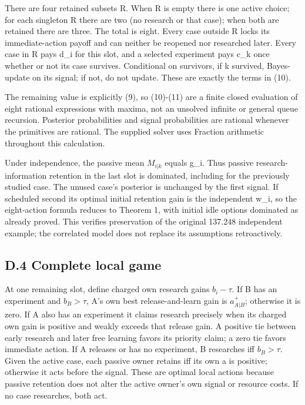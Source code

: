 \documentclass[
  11pt,
]{article}
\begin{document}
There are four retained subsets R. When R is empty there is one active
choice; for each singleton R there are two (no research or that case);
when both are retained there are three. The total is eight. Every case
outside R locks its immediate-action payoff and can neither be reopened
nor researched later. Every case in R pays d\_i for this slot, and a
selected experiment pays c\_k once whether or not its case survives.
Conditional on survivors, if k survived, Bayes-update on its signal; if
not, do not update. These are exactly the terms in (10).

The remaining value is explicitly (9), so (10)-(11) are a finite closed
evaluation of eight rational expressions with maxima, not an unsolved
infinite or general queue recursion. Posterior probabilities and signal
probabilities are rational whenever the primitives are rational. The
supplied solver uses Fraction arithmetic throughout this calculation.

Under independence, the passive mean \(M_{i|k}\) equals g\_i. Thus
passive research-information retention in the last slot is dominated,
including for the previously studied case. The unused case's posterior
is unchanged by the first signal. If scheduled second its optimal
initial retention gain is the independent w\_i, so the eight-action
formula reduces to Theorem 1, with initial idle options dominated as
already proved. This verifies preservation of the original 137.248
independent example; the correlated model does not replace its
assumptions retroactively.

\subsection{D.4 Complete local game}\label{d.4-complete-local-game}

At one remaining slot, define charged own research gains \(b_i-\tau\).
If B has an experiment and \(b_B>\tau\), A's own best release-and-learn
gain is \(a_{A|B}^+\); otherwise it is zero. If A also has an experiment
it claims research precisely when its charged own gain is positive and
weakly exceeds that release gain. A positive tie between early research
and later free learning favors its priority claim; a zero tie favors
immediate action. If A releases or has no experiment, B researches iff
\(b_B>\tau\). Given the active case, each passive owner retains iff its
own a is positive; otherwise it acts before the signal. These are
optimal local actions because passive retention does not alter the
active owner's own signal or resource costs. If no case researches, both
act.
\end{document}
